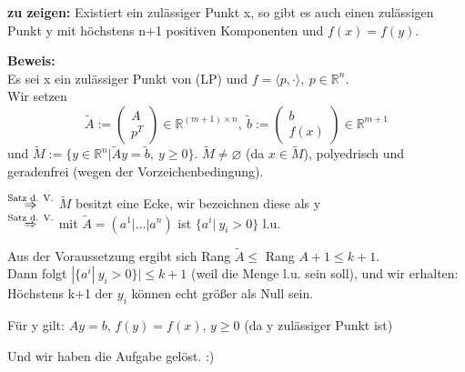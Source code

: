 \documentclass[a4paper,11pt,twoside,titlepage]{article}
\newcommand{\R}{{\mathbb R}}
\begin{document}
\textbf{zu zeigen:} Existiert ein zulässiger Punkt x, so gibt es auch einen zulässigen Punkt y mit höchstens n+1 positiven Komponenten und $f(x)=f(y)$.

\textbf{Beweis:}\\
Es sei x ein zulässiger Punkt von (LP) und $f=\langle p,\cdot\rangle,\:p\in\R^n$.\\
Wir setzen
\[\tilde A:=\begin{pmatrix} A  \\\hline p^T \end{pmatrix}\in\R^{(m+1)\times n},\ \tilde b:=\begin{pmatrix} b\\\hline f(x)\end{pmatrix}\in\R^{m+1}\]
und $\widetilde{M}:=\{y\in\R^n|\tilde Ay=\tilde b,\:y\geq0\}$.
$\widetilde{M}\neq\varnothing$ (da $x\in\widetilde{M}$), polyedrisch und geradenfrei (wegen der Vorzeichenbedingung).

$\stackrel{\mbox{\scriptsize{Satz d. V.}}}{\Rightarrow}$ $\widetilde{M}$ besitzt eine Ecke, wir bezeichnen diese als y\\
$\stackrel{\mbox{\scriptsize{Satz d. V.}}}{\Rightarrow}$ mit $\tilde A=(a^1|\ldots|a^n)$ ist $\{a^i|\:y_i>0\}$ l.u.

Aus der Voraussetzung ergibt sich Rang $\tilde A\leq$ Rang $A+1\leq k+1$.\\
Dann folgt $|\{a^i|\:y_i>0\}|\leq k+1$ (weil die Menge l.u. sein soll), und wir erhalten: Höchstens k+1 der $y_i$ können echt größer als Null sein.

Für y gilt: $Ay=b$, $f(y)=f(x)$, $y\geq 0$ (da y zulässiger Punkt ist)

Und wir haben die Aufgabe gelöst. :)
\end{document}
